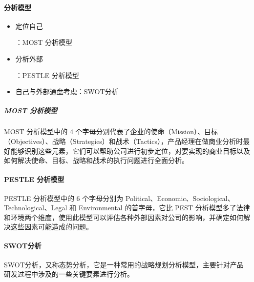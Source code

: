 \documentclass[letterpaper,10pt,english]{sphinxmanual}
\begin{document}
\paragraph{分析模型}
\label{\detokenize{chapter_knowledge/compete_analysis:id7}}\begin{itemize}
\item {} 
定位自己
%
\begin{footnote}[552]\sphinxAtStartFootnote
{}
%
\end{footnote}：MOST
分析模型

\item {} 
分析外部
%
\begin{footnote}[553]\sphinxAtStartFootnote
{}
%
\end{footnote}：PESTLE
分析模型

\item {} 
自己与外部通盘考虑：SWOT分析

\end{itemize}


\subparagraph{MOST 分析模型}
\label{\detokenize{chapter_knowledge/compete_analysis:most}}
MOST 分析模型中的 4
个字母分别代表了企业的使命（Mission）、目标（Objectives）、战略（Strategies）和战术（Tactics），产品经理在做商业分析时最好能够识别这些元素，它们可以帮助公司进行初步定位，对要实现的商业目标以及如何解决使命、目标、战略和战术的执行问题进行全面分析。


\paragraph{PESTLE 分析模型}
\label{\detokenize{chapter_knowledge/compete_analysis:pestle}}
PESTLE 分析模型中的 6 个字母分别为
Political、Economic、Sociological、Technological、Legal 和 Environmental
的首字母，它比 PEST
分析模型多了法律和环境两个维度，使用此模型可以评估各种外部因素对公司的影响，并确定如何解决这些因素可能造成的问题。


\paragraph{SWOT分析}
\label{\detokenize{chapter_knowledge/compete_analysis:swot}}
SWOT分析，又称态势分析，它是一种常用的战略规划分析模型，主要针对产品研发过程中涉及的一些关键要素进行分析。
\end{document}
